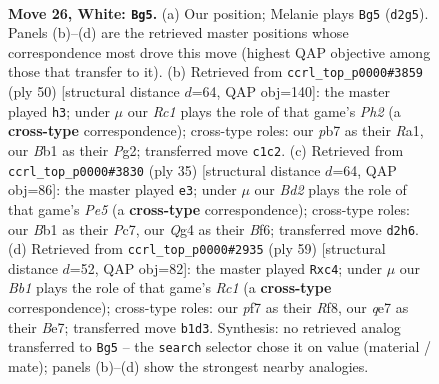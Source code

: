 \documentclass[11pt]{article}
\begin{document}
\clearpage

\begin{figure}[p]\centering
\begin{subfigure}{0.46\textwidth}\centering
\resizebox{\linewidth}{!}{%
\newchessgame
\chessboard[
  setfen={rn1r2k1/pp2qppp/8/2P1P3/6Q1/P5P1/1P1B1P2/1BR1R1K1 w - - 1 26},
  showmover=false,
  pgfstyle=straightmove, color=movearrow, markmove={d2-g5}
]}
\caption{}
\end{subfigure}\hfill
\begin{subfigure}{0.46\textwidth}\centering
\resizebox{\linewidth}{!}{%
\newchessgame
\chessboard[
  setfen={qr3nk1/5pp1/rp1p3p/8/PQ1BP3/5P2/6PP/R2R2K1 w - - 5 26},
  showmover=false,
  pgfstyle=straightmove, color=movearrow, markmove={h2-h3}
]}
\caption{}
\end{subfigure}
\\[4pt]
\begin{subfigure}{0.46\textwidth}\centering
\resizebox{\linewidth}{!}{%
\newchessgame
\chessboard[
  setfen={r4rk1/ppp3pp/5b2/3P4/q3p3/2P5/PP1NQPPP/R3K2R b KQ - 0 18},
  showmover=false,
  pgfstyle=straightmove, color=movearrow, markmove={e4-e3}
]}
\caption{}
\end{subfigure}\hfill
\begin{subfigure}{0.46\textwidth}\centering
\resizebox{\linewidth}{!}{%
\newchessgame
\chessboard[
  setfen={2r2rk1/1p2bp2/3p2p1/q2P4/2PN1R1P/p5Q1/P5P1/R6K b - - 0 30},
  showmover=false,
  pgfstyle=straightmove, color=movearrow, markmove={c8-c4}
]}
\caption{}
\end{subfigure}
\caption{\textbf{Move 26, White: \texttt{Bg5}.} (a) Our position; Melanie plays \texttt{Bg5} (\texttt{d2g5}). Panels (b)--(d) are the retrieved master positions whose correspondence most drove this move (highest QAP objective among those that transfer to it). (b) Retrieved from \texttt{ccrl\_top\_p0000\#3859} (ply 50) [structural distance $d$=64, QAP obj=140]: the master played \texttt{h3}; under $\mu$ our \emph{Rc1} plays the role of that game's \emph{Ph2} (a \textbf{cross-type} correspondence); cross-type roles: our \emph{p}b7 as their \emph{R}a1, our \emph{B}b1 as their \emph{P}g2; transferred move \texttt{c1c2}. (c) Retrieved from \texttt{ccrl\_top\_p0000\#3830} (ply 35) [structural distance $d$=64, QAP obj=86]: the master played \texttt{e3}; under $\mu$ our \emph{Bd2} plays the role of that game's \emph{Pe5} (a \textbf{cross-type} correspondence); cross-type roles: our \emph{B}b1 as their \emph{P}c7, our \emph{Q}g4 as their \emph{B}f6; transferred move \texttt{d2h6}. (d) Retrieved from \texttt{ccrl\_top\_p0000\#2935} (ply 59) [structural distance $d$=52, QAP obj=82]: the master played \texttt{Rxc4}; under $\mu$ our \emph{Bb1} plays the role of that game's \emph{Rc1} (a \textbf{cross-type} correspondence); cross-type roles: our \emph{p}f7 as their \emph{R}f8, our \emph{q}e7 as their \emph{B}e7; transferred move \texttt{b1d3}. Synthesis: no retrieved analog transferred to \texttt{Bg5} -- the \texttt{search} selector chose it on value (material / mate); panels (b)--(d) show the strongest nearby analogies.}
\label{fig:thought-m50}
\end{figure}
\end{document}
